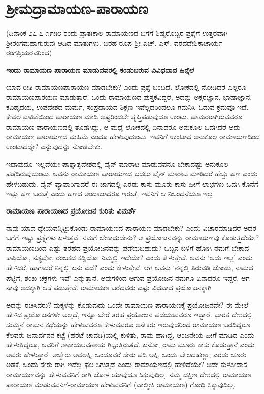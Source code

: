 \chapter{ಶ್ರೀಮದ್ರಾಮಾಯಣ-ಪಾರಾಯಣ} 

(ದಿನಾಂಕ ೨೭-೭-೧೯೫೮ ರಂದು ಪ್ರಾತಃಕಾಲ ರಾಮಾಯಣದ ಬಗೆಗೆ ಶಿಷ್ಯರೊಬ್ಬರ ಪ್ರಶ್ನೆಗೆ ಉತ್ತರವಾಗಿ ಶ್ರೀರಂಗಮಹಾಗುರುವು ಆಡಿದ ಮಾತುಗಳು. ಬರಹ ರೂಪ ಶ್ರೀ ಎಚ್‍. ಎಸ್‍. ವರದದೇಶಿಕಾಚಾರ್ಯ ರಂಗಪ್ರಿಯರವರಿಂದ) 

{\bf ಇಂದು ರಾಮಾಯಣ ಪಾರಾಯಣ ಮಾಡುವವರಲ್ಲಿ ಕಂಡುಬರುವ ವಿವಿಧವಾದ ಹಿನ್ನೆಲೆ} 


ಯಾವ ರೀತಿ ರಾಮಾಯಣಪಾರಾಯಣ ಮಾಡಬೇಕು? ಎಂದು ಪ್ರಶ್ನೆ ಬಂದಿದೆ. ಲೋಕದಲ್ಲಿ ನೋಡಿದರೆ ಎಲ್ಲರೂ ರಾಮಾಯಣಪಾರಯಣ ಮಾಡುತ್ತಾರೆ. ಒಂದು ರಾಮಾಯಣದ ಪುಸ್ತಕವಿದ್ದರೆ, ಅದನ್ನು ಅಕ್ಷರಜ್ಞಾನ, ಭಾಷಾಜ್ಞಾನ, ಕವಿಹೃದಯ, ಉಪದೇಶದ ಮರ್ಮ, ಸಂಪ್ರದಾಯದ ಶಿಕ್ಷಣ ಇವೆಲ್ಲದರಿಂದಲೂ ಗಮನಿಸಿ ಓದುವ ಕ್ರಮವೂ ಇದೆ. ಕೇವಲ ವಾಡಿಕೆಯಿಂದ ಪಾರಾಯಣ ಮಾಡಿ ಅಷ್ಟರಿಂದಲೇ ತೃಪ್ತಿಪಡುವುದೂ ಉಂಟು. ಪಾಮರರಾಗಿರುವವರೂ ರಾಮಾಯಣ ಪಾರಾಯಣದಲ್ಲಿ ತೊಡಗಿದ್ದು, ಆ ಮಧ್ಯೆ ಲೋಕದಲ್ಲಿ ಏನಾದರೂ ಅನುಕೂಲ ಒದಗಿದರೆ ಅದು ರಾಮಾಯಣ ಪಾರಾಯಣದ ಮಹಿಮೆ ಎಂದೂ ಹೇಳುವುದುಂಟು. ಇವನಿಗೆ ಉಂಟಾದ ಅನುಕೂಲ ರಾಮಾಯಣದಿಂದ ಉಂಟಾದದ್ದೇ? ಎನ್ನುವುದನ್ನು ನೋಡಬೇಕು. 


ಇದಾವುದೂ ಇಲ್ಲದೆಯೇ ಪಾಶ್ಚಾತ್ಯದೇಶದಲ್ಲಿ ವೈನ್‍ ಮಾರಾಟ ಮಾಡುವವನೂ ಬೇಕಾದಷ್ಟು ಅನುಕೂಲ ಪಡೆದಿರುವುದುಂಟು. ಅವನು ರಾಮಾಯಣ ಪಾರಾಯಣದ ಬದಲು ವೈನ್‍ ಮಾರಾಟ ಮಾಡಿದರೆ ಹೆಚ್ಚು ಹಣ ಎಂದು ಹೇಳಬಹುದು. ವೈನ್‍ ವ್ಯಾಪಾರಿಗಾದರೆ ಈ ಜಾಗದಲ್ಲಿ ಎರಡು ಕಾಸು ಮೂರು ಕಾಸು ಹೀಗೆ ಲಾಭಗಳು ಒದಗಿ ಕೊನೆಗೆ ಇಷ್ಟು ಹಣ ಬರುತ್ತೆ ಎಂದು ಹಣದ ಅಂದಾಜಾದರೂ ಇರುತ್ತೆ. ಇವನಿಗೆ ಆ ನಿಬಂಧನೆಯೂ ಇಲ್ಲ. 


{\bf ರಾಮಾಯಣ ಪಾರಾಯಣದ ಪ್ರಯೋಜನ ಕುರಿತು ವಿಮರ್ಶೆ} 


ನಾವು ಯಾವ ಧ್ಯೇಯವನ್ನಿಟ್ಟುಕೊಂಡು ರಾಮಾಯಣದ ಪಾರಾಯಣ ಮಾಡಬೇಕು? ಎಂದು ವಿಚಾರಮಾಡಿದರೆ ಅದರ ಬಗೆಗೆ ಇಷ್ಟು ಪ್ರಶ್ನೆಗಳು ಏಳುತ್ತವೆ. ನಮಗೆ ಬೇಕಾದುದೇನು? ಆ ಪ್ರಯೋಜನವನ್ನು ರಾಮಾಯಣವು ಕೊಡುತ್ತದೆಯೇ? ರಾಮಾಯಣದಿಂದ ಎಷ್ಟು ತರಹದ ಪ್ರಯೋಜನವನ್ನು ಪಡೆಯಬಹುದು? ಒಬ್ಬನ ಬಳಿಗೆ ಹೋಗಿ ನಮಗೆ ಬೇಕಾದ ಕಾಫಿಯೋ, ನಶ್ಯವೋ, ರಂಜಕದ ಕಡ್ಡಿಯೋ ನಿಮ್ಮಲ್ಲಿ ಇದೆಯೇ? ಎಂದು ಕೇಳುತ್ತೇವೆ. ಅವನು `ಅದು ಇಲ್ಲ' ಎಂದು ಹೇಳಿದರೆ, ಹಾಗಾದರೆ ನಿನ್ನಲ್ಲಿ ಏನು ಎದೆ? ಎಂದು ಕೇಳುತ್ತೇವೆ. ಆಗ ಅವನು `ನನ್ನಲ್ಲಿ ತಿರುವಡಿ ಜೋಡು, ನಾಮದ ಪೆಟ್ಟಿಗೆ, ಶಂಖ ಚಕ್ರಗಳು ಇವೆ' ಎನ್ನುತ್ತಾನೆ. ಅವುಗಳಿಂದ ಆಗುವ ಪ್ರಯೋಜನ ನಮಗೂ ಏನಾದರೂ ಇದ್ದರೆ, ಆಗ ನಾವು ಅದಕ್ಕಾಗಿ ಆಸೆ ಪಡುತ್ತೇವೆ. ರಾಮಾಯಣ ಬರೆದವರು ಎಷ್ಟು ವಿಧವಾದ ಪ್ರಯೋಜನಕ್ಕಾಗಿ 

ಅದನ್ನು ರಚಿಸಿದರು? ಮಕ್ಕಳನ್ನು ಕೊಡುವುದು ಒಂದೇ ರಾಮಾಯಣ ಪಾರಾಯಣಕ್ಕೆ ಪ್ರಯೋಜನವೇ? ಈ ಮೇಲೆ ಹೇಳಿದ ಪ್ರಯೋಜನಗಳೇ ಅಲ್ಲದೆ, ಇನ್ನೂ ಬೇರೆ ತರಹ ಪ್ರಯೋಜನ ಪಡೆಯುವವರೂ ಇದ್ದಾರೆ. ಭಾರತ ದೇಶದಲ್ಲಿ ಸುಮ್ಮನೆ ರಾಮನ ಕಥೆಯನ್ನು ಹೇಳುವವರೂ ಕೇಳುವವರೂ ಅನೇಕರು ಇರುವುದರಿಂದ ರಾಮಾಯಣ ಬರದಿದ್ದರೂ ಕೆಲವರು ಜನಾರ್ದನನ ಕಟ್ಟೆ (ಹರಟೆ ಚಾವಡಿ)ಯಲ್ಲಿ ಕುಳಿತು, ರಾಮ ಹಾಗಿದ್ದ, ಆಂಜನೇಯ ಹೀಗೆ ಮಾಡಿದ ಎಂದು ಹೇಳುತ್ತಿದ್ದರೂ, ಅವರಿಗೆ ಶಾಕಾಯಲವಣಾಯ ಗಿಟ್ಟುತ್ತಿರುತ್ತದೆ. ಏನೋ, ರಾಮ ಮೂರು ಕಾಸು ಕೊಡುತ್ತಾನೆ ಎಂದು ಅವರು ಹೇಳುತ್ತಾರೆ. ಅಚ್ಚೇರು ಅವಲಕ್ಕಿ, ಒಂದೂವರೆ ಸೇರು ಪಡಿ ಅಕ್ಕಿ, ಒಂದು ಬೇಲದಹಣ್ಣು, ಎರಡು ಚೂರು ಅಡಕೆ, ಒಂದು ಸೇರು ರಾಗಿ ಇದೆಲ್ಲ ಫಲ ಸಿಗುತ್ತದೆ ಎಂದು ರಾಮಾಯಣದಲ್ಲಿ ಹೇಳಿದೆಯೇ? ಅದೇ ತುಳಸೀದಾಸ ರಾಮಾಯಣವನ್ನು ಹೇಳುವವನಿಗೆ ರಾಗಿ ಜೋಳ ಯಾವುದೂ ಸಿಕ್ಕುವುದಿಲ್ಲ. ನಮ್ಮ ದಕ್ಷಿಣ ದೇಶದಲ್ಲಿ ರಾಮಾಯಣ ಪಾರಾಯಣ ಮಾಡುವವನಿಗೆ-ರಾಮಾಯಣ ಹೇಳುವವನಿಗೆ (ವಾಲ್ಮೀಕಿ ರಾಮಾಯಣ) ಗೋಧಿ ಸಿಕ್ಕುವುದಿಲ್ಲ. 


